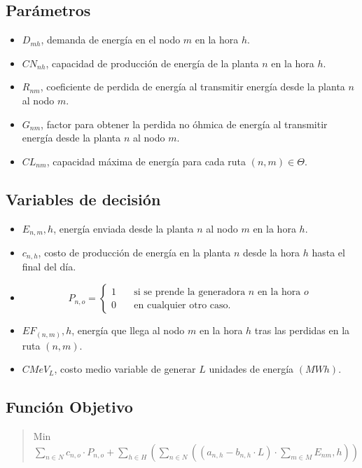 \documentclass[addpoints,10pt]{exam}
\begin{document}
\begin{flushleft}
		\subsection{Parámetros}
		\begin{itemize}
			\item $D_{mh}$, demanda de energía en el nodo $m$ en la hora $h$.
			\item $CN_{nh}$, capacidad de producción de energía de la planta $n$ en la hora $h$.
			\item $R_{nm}$, coeficiente de perdida de energía al transmitir energía desde la planta $n$ al nodo $m$.
			\item $G_{nm}$, factor para obtener la perdida no óhmica de energía al transmitir energía desde la planta $n$ al nodo $m$.
			\item $CL_{nm}$, capacidad máxima de energía para cada ruta $(n,m) \in \Theta$.
		\end{itemize}
		\subsection{Variables de decisión} 
		\begin{itemize}
			\item $E_{n,m},h$, energía enviada desde la planta $n$ al nodo $m$ en la hora $h$.
			\item $c_{n,h}$, costo de producción de energía en la planta $n$ desde la hora $h$ hasta el final del día.
			\item \[
				P_{n,o} = 
					 \begin{cases}
					   1 &\quad\text{si se prende la generadora }n\text{ en la hora }o\\
					   0 &\quad\text{en cualquier otro caso.}
					 \end{cases}
				\]
			\item $EF_(n,m),h$, energía que llega al nodo $m$ en la hora $h$ tras las perdidas en la ruta $(n,m)$.
			\item $CMeV_{L}$, costo medio variable de generar $L$ unidades de energía $(MWh)$.
		\end{itemize}
		\subsection{Función Objetivo}
		\begin{quote}
			\begin{center}
				Min $\sum\limits_{n \in N} c_{n,o} \cdot P_{n,o} + \sum\limits_{h \in H} (\sum\limits_{n \in N} ((a_{n,h} - b_{n,h} \cdot L) \cdot \sum\limits_{m \in M} E_{nm},h))$
			\end{center}
		\end{quote}

\end{flushleft}
\end{document}
